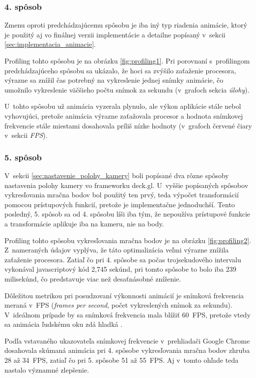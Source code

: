 \subsubsection{4. spôsob}

Zmenu oproti predchádzajúcemu spôsobu je iba iný typ riadenia animácie, ktorý je použitý aj vo finálnej verzii implementácie a detailne popísaný v~sekcii \ref{sec:implementacia_animacie}.

Profiling tohto spôsobu je na obrázku \ref{fig:profiling1}. Pri porovnaní s~profilingom predchádzajúceho spôsobu sa ukázalo, že hoci sa zvýšilo zaťaženie procesora, výrazne sa znížil čas potrebný na vykreslenie jednej snímky animácie, čo umožnilo vykreslenie väčšieho počtu snímok za sekundu (v~grafoch sekcia \emph{úlohy}).

U~tohto spôsobu už animácia vyzerala plynulo, ale výkon aplikácie stále nebol vyhovujúci, pretože animácia výrazne zaťažovala procesor a hodnota snímkovej frekvencie stále miestami dosahovala príliš nízke hodnoty (v~grafoch červené čiary v~sekcii \emph{FPS}).

\subsubsection{5. spôsob}

V~sekcii \ref{sec:nastavenie_polohy_kamery} boli popísané dva rôzne spôsoby nastavenia polohy kamery vo frameworku deck.gl. U~vyššie popísaných spôsobov vykresľovania mračna bodov bol použitý ten prvý, teda výpočet transformácií pomocou prístupových funkcií, pretože je implementačne jednoduchší. Tento posledný, 5. spôsob sa od 4. spôsobu líši iba tým, že nepoužíva prístupové funkcie a transformácie aplikuje iba na kameru, nie na body. 

Profiling tohto spôsobu vykresľovania mračna bodov je na obrázku \ref{fig:profiling2}. Z~nameraných údajov vyplýva, že táto optimalizácia veľmi výrazne znížila zaťaženie procesora. Zatiaľ čo pri 4. spôsobe sa počas trojsekudového intervalu vykonával javascriptový kód 2,745 sekúnd, pri tomto spôsobe to bolo iba 239 milisekúnd, čo predstavuje viac než desaťnásobné zníženie.

Dôležitou metrikou pri posudzovaní výkonnosti animácií je snímková frekvencia meraná v~FPS (\emph{frames per second}, počet vykreslených snímok za sekundu). V~ideálnom prípade by sa snímková frekvencia mala blížiť 60~FPS, pretože vtedy sa animácia ľudskému oku zdá hladká \cite{chrome_profiling}.

Podľa vstavaného ukazovateľa snímkovej frekvencie v~prehliadači Google Chrome dosahovala skúmaná animácia pri 4. spôsobe vykresľovania mračna bodov zhruba 28 až 34~FPS, zatiaľ čo pri 5. spôsobe 51 až 55~FPS. Aj v~tomto ohľade teda nastalo významné zlepšenie.

